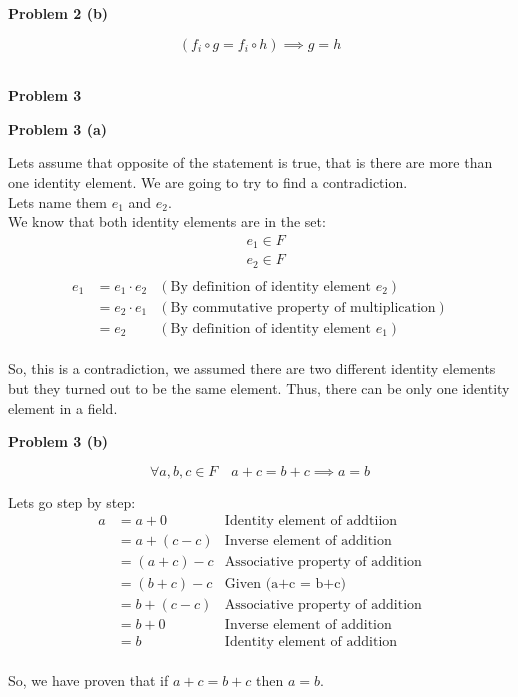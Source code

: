 \documentclass{article}
\begin{document}
\begin{flushleft}
   \textbf{\Large Problem 2 (b)}
\end{flushleft}

\[
   (f_i \circ g = f_i \circ h) \implies g = h
\]
\\


\begin{flushleft}
   \textbf{\Large Problem 3}
\end{flushleft}


\begin{flushleft}
   \textbf{\Large Problem 3 (a)}
\end{flushleft}

Lets assume that opposite of the statement is true, that is there are more than one identity element. We are going to try to find a contradiction. \\
Lets name them \(e_1\) and \(e_2\). \\
We know that both identity elements are in the set:
\begin{align*}
   & e_1 \in F \\
   & e_2 \in F \\
\end{align*}
\begin{align}
   e_1 & = e_1 \cdot e_2 & (\text{By definition of identity element \(e_2\)}) \\
       & = e_2 \cdot e_1 & (\text{By commutative property of multiplication}) \\
       & = e_2           & (\text{By definition of identity element \(e_1\)})
\end{align}
\\
So, this is a contradiction, we assumed there are two different identity elements but they turned out to be the same element. Thus, there can be only one identity element in a field. \\


\begin{flushleft}
   \textbf{\Large Problem 3 (b)}
\end{flushleft}

\[
   \forall a,b,c \in F \quad a + c = b + c \implies a = b
\]

Lets go step by step: \\
\begin{align}
   a &= a + 0 &\text{Identity element of addtiion} \\
     &= a + (c - c) &\text{Inverse element of addition} \\
     &= (a + c) - c &\text{Associative property of addition} \\
     &= (b + c) - c &\text{Given (a+c = b+c)} \\
     &= b + (c - c) &\text{Associative property of addition} \\
     &= b + 0 &\text{Inverse element of addition} \\
     &= b &\text{Identity element of addition}
\end{align}
\\
So, we have proven that if \(a + c = b + c\) then \(a = b\). \\
\end{document}
